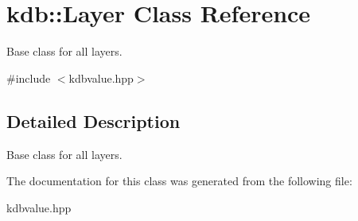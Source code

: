 \hypertarget{classkdb_1_1Layer}{\section{kdb\-:\-:Layer Class Reference}
\label{classkdb_1_1Layer}
}


Base class for all layers.  




{\ttfamily \#include $<$kdbvalue.\-hpp$>$}



\subsection{Detailed Description}
Base class for all layers. 

The documentation for this class was generated from the following file\-:\begin{DoxyCompactItemize}
\item 
kdbvalue.\-hpp\end{DoxyCompactItemize}
